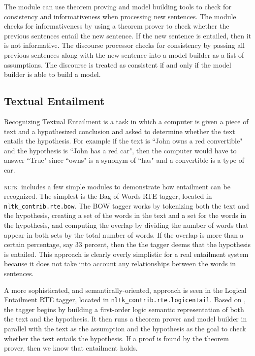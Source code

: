 \documentclass[11pt,a4paper]{article}
\newcommand{\NLTK}{\textsc{nltk}}
\newcommand{\dhgcode}[1]{{\tt #1}}
\begin{document}
The module can use theorem proving and model building tools to check
for consistency and informativeness when processing new sentences.
The module checks for informativeness by using a theorem prover to
check whether the previous sentences entail the new sentence.  If the
new sentence is entailed, then it is not informative.  The discourse
processor checks for consistency by passing all previous sentences
along with the new sentence into a model builder as a list of
assumptions.  The discourse is treated as consistent if and only if
the model builder is able to build a model.

\subsection{Textual Entailment}
Recognizing Textual Entailment is a task in which a computer is given
a piece of text and a hypothesized conclusion and asked to determine
whether the text entails the hypothesis.  For example if the text is
``John owns a red convertible" and the hypothesis is ``John has a red
car", then the computer would have to answer ``True" since ``owns" is
a synonym of ``has" and a convertible is a type of car.

\NLTK\ includes a few simple modules to demonstrate how entailment can
be recognized.  The simplest is the Bag of Words RTE tagger, located
in \dhgcode{nltk\_contrib.rte.bow}.  The BOW tagger works by
tokenizing both the text and the hypothesis, creating a set of the
words in the text and a set for the words in the hypothesis, and
computing the overlap by dividing the number of words that appear in
both sets by the total number of words.  If the overlap is more than a
certain percentage, say 33 percent, then the the tagger deems that the
hypothesis is entailed.  This approach is clearly overly simplistic
for a real entailment system because it does not take into account any
relationships between the words in sentences.

A more sophisticated, and semantically-oriented, approach is seen in
the Logical Entailment RTE tagger, located in
\dhgcode{nltk\_contrib.rte.logicentail}.  Based on \cite{BosRTE}, the
tagger begins by building a first-order logic semantic representation
of both the text and the hypothesis.  It then runs a theorem prover
and model builder in parallel with the text as the assumption and the
hypothesis as the goal to check whether the text entails the
hypothesis.  If a proof is found by the theorem prover, then we know
that entailment holds.
\end{document}
